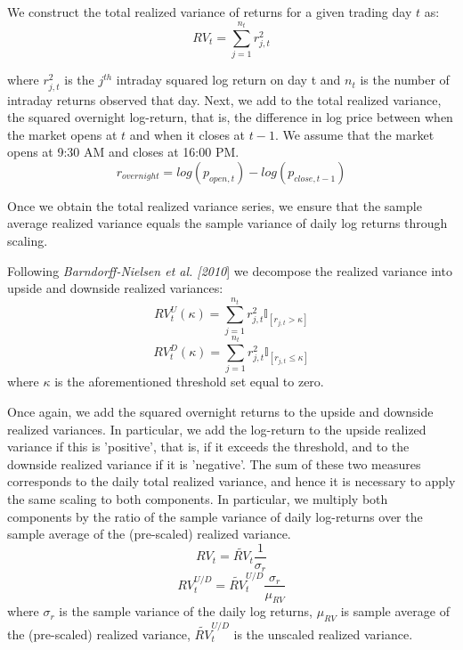 \vspace{4mm}
We construct the total realized variance of returns for a given trading day $t$ as: 
\begin{equation}\label{eq:RV}
RV_{t} = \sum_{j = 1}^{n_{t}} r_{j,t}^{2}
\end{equation}

where $r_{j,t}^{2}$ is the $j^{th}$ intraday squared log return on day t and $n_{t}$ is the number of intraday returns observed that day. 
Next, we add to the total realized variance, the squared overnight log-return, that is, the difference in log price between when the market opens at $t$ and when it closes at $t-1$. We assume that the market opens at 9:30 AM and closes at 16:00 PM. 
\begin{equation}\label{eq:ln}
r_{overnight} = log(p_{open,t}) - log(p_{close, t-1})
\end{equation}

Once we obtain the total realized variance series, we ensure that the sample average realized variance equals the sample variance of daily log returns through scaling. 

\vspace{4mm}
Following \textit{Barndorff-Nielsen et al. [2010}] we decompose the realized variance into upside and downside realized variances: 
\begin{equation}\label{eq:RVU}
RV_{t}^{U}(\kappa) =\sum_{j=1}^{n_{t}} r_{j,t}^{2} \mathbb{I}_{[r_{j,t} > \kappa]}
\end{equation}
\begin{equation}\label{eq:RVD}
RV_{t}^{D}(\kappa) = \sum_{j=1}^{n_{t}} r_{j,t}^{2} \mathbb{I}_{[r_{j,t} \leq \kappa]}
\end{equation}
where $\kappa$ is the aforementioned threshold set equal to zero. 

Once again, we add the squared overnight returns to the upside and downside realized variances. In particular, we add the log-return to the upside realized variance if this is 'positive', that is, if it exceeds the threshold, and to the downside realized variance if it is 'negative'. The sum of these two measures corresponds to the daily total realized variance, and hence it is necessary to apply the same scaling to both components. In particular, we multiply both components by the ratio of the sample variance of daily log-returns over the sample average of the (pre-scaled) realized variance.
\begin{equation}\label{eq:scaling}
RV_{t} = \tilde{RV}_{t} \frac{1}{\sigma_{r}} 
\end{equation}
\begin{equation}\label{eq:scaling1}
RV_{t}^{U/D} = \tilde{RV}_{t}^{U/D}  \frac{\sigma_{r}}{\mu_{RV}}
\end{equation}
where $\sigma_{r}$ is the sample variance of the daily log returns, $\mu_{RV}$ is sample average of the (pre-scaled) realized variance, $\tilde{RV}_{t}^{U/D}$ is the unscaled realized variance. 

